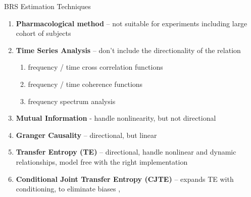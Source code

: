 \begin{frame}{BRS Estimation Techniques}
\begin{enumerate}
        \item \textbf{Pharmacological method} -- not suitable for experiments including large cohort of subjects
        \item \textbf{Time Series Analysis} -- don't include the directionality of the relation
        \begin{enumerate}
        \item frequency / time cross correlation functions
        \item frequency / time coherence functions
        \item frequency spectrum analysis
        \end{enumerate}
        \item \textbf{Mutual Information} - handle nonlinearity, but not directional
        \item \textbf{Granger Causality} -- directional, but linear
        \item \textbf{Transfer Entropy (TE)} -- directional, handle nonlinear and dynamic relationships, model free with the right implementation
        \item \textbf{Conditional Joint Transfer Entropy (CJTE)} -- expands TE with conditioning, to eliminate biases \cite{mehta2018directional}, \cite{shahsavari2020estimating}
    \end{enumerate}
\end{frame}
